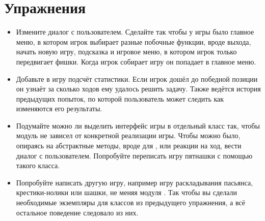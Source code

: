\section{Упражнения}

\begin{itemize}

\item Измените диалог с пользователем. Сделайте 
    так чтобы у игры было главное меню, в котором
    игрок выбирает разные побочные функции, вроде
    выхода, начать новую игру, подсказка и игровое
    меню, в котором игрок только передвигает фишки.
    Когда игрок собирает игру он попадает в 
    главное меню.

\item Добавьте в игру подсчёт статистики. Если игрок
    дошёл до победной позиции он узнаёт за сколько ходов ему
    удалось решить задачу. Также ведётся история
	предыдущих попыток, по которой пользователь может
	следить как изменяются его результаты. 

\item Подумайте можно ли выделить интерфейс игры в 
	отдельный класс так,
  чтобы модуль  не зависел от конкретной реализации
  игры. Чтобы можно было, опираясь на абстрактные методы, 
  вроде  для , или реакции на ход, 
  вести диалог с пользователем. Попробуйте переписать
  игру пятнашки с помощью такого класса. 

\item Попробуйте написать другую игру, например
    игру раскладывания пасьянса, крестики-нолики
    или шашки, не меняя модуля .
    Так чтобы вы сделали необходимые экземпляры для классов
    из предыдущего упражнения, а всё
    остальное поведение следовало из них.
\end{itemize}

